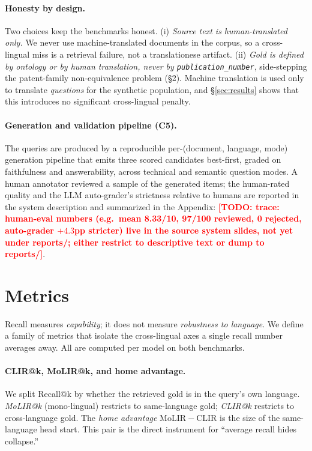 \documentclass[11pt]{article}
\newcommand{\todo}[1]{\textcolor{red}{\textbf{[TODO: #1]}}}
\begin{document}
\paragraph{Honesty by design.}
Two choices keep the benchmarks honest. (i) \emph{Source text is
human-translated only.} We never use machine-translated documents in the
corpus, so a cross-lingual miss is a retrieval failure, not a translationese
artifact. (ii) \emph{Gold is defined by ontology or by human translation, never
by \texttt{publication\_number}}, side-stepping the patent-family
non-equivalence problem (\S2). Machine translation is used only to translate
\emph{questions} for the synthetic population, and \S\ref{sec:results} shows
that this introduces no significant cross-lingual penalty.

\paragraph{Generation and validation pipeline (C5).}
The queries are produced by a reproducible per-(document, language, mode)
generation pipeline that emits three scored candidates best-first, graded on
faithfulness and answerability, across technical and semantic question modes.
A human annotator reviewed a sample of the generated items; the human-rated
quality and the LLM auto-grader's strictness relative to humans are reported in
the system description and summarized in the Appendix:
\todo{trace: human-eval numbers (e.g.\ mean 8.33/10, 97/100 reviewed, 0
rejected, auto-grader $+4.3$pp stricter) live in the source system slides, not
yet under reports/; either restrict to descriptive text or dump to reports/}.

\section{Metrics}
\label{sec:metrics}

Recall measures \emph{capability}; it does not measure \emph{robustness to
language}. We define a family of metrics that isolate the cross-lingual axes a
single recall number averages away. All are computed per model on both
benchmarks.

\paragraph{CLIR@k, MoLIR@k, and home advantage.}
We split Recall@k by whether the retrieved gold is in the query's own language.
\emph{MoLIR@k} (mono-lingual) restricts to same-language gold; \emph{CLIR@k}
restricts to cross-language gold. The \emph{home advantage}
$\mathrm{MoLIR}{-}\mathrm{CLIR}$ is the size of the same-language head start.
This pair is the direct instrument for ``average recall hides collapse.''
\end{document}
